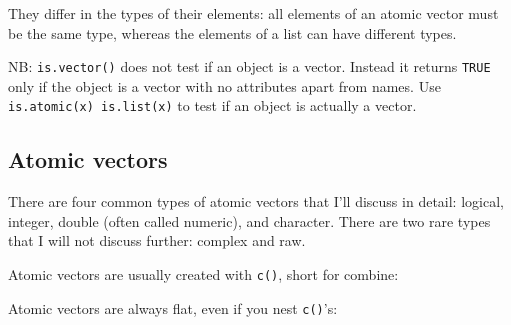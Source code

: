 They differ in the types of their elements: all elements of an atomic
vector must be the same type, whereas the elements of a list can have
different types.

NB: \texttt{is.vector()} does not test if an object is a vector. Instead
it returns \texttt{TRUE} only if the object is a vector with no
attributes apart from names. Use
\texttt{is.atomic(x) \textbar{}\textbar{} is.list(x)} to test if an
object is actually a vector.

\subsection{Atomic vectors}

There are four common types of atomic vectors that I'll discuss in
detail: logical, integer, double (often called numeric), and character.
There are two rare types that I will not discuss further: complex and
raw.  

Atomic vectors are usually created with \texttt{c()}, short for combine:

\begin{Shaded}
\begin{Highlighting}[]
\StringTok{ }\NormalTok{(}\NormalTok{, }\NormalTok{, }\NormalTok{)}
\StringTok{ }
\StringTok{ }\NormalTok{(}\NormalTok{, }
\StringTok{ }\NormalTok{(}\NormalTok{, }\NormalTok{)}
\end{Highlighting}
\end{Shaded}

Atomic vectors are always flat, even if you nest \texttt{c()}'s:

\begin{Shaded}
\begin{Highlighting}[]
\NormalTok{(}\NormalTok{, }\NormalTok{(}\NormalTok{, }\NormalTok{(}\NormalTok{, }\NormalTok{)))}
\NormalTok{(}\NormalTok{, }\NormalTok{, }\NormalTok{, }\NormalTok{)}
\end{Highlighting}
\end{Shaded}


